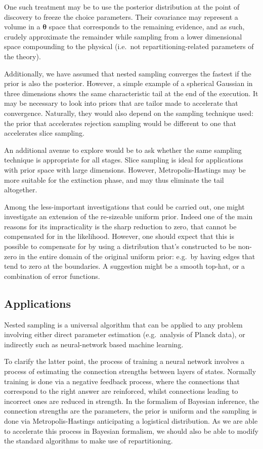 \documentclass[usenatbib]{mnras}
\begin{document}
One such treatment may be to use the posterior distribution at the
point of discovery to freeze the choice parameters. Their
covariance may represent a volume in a \(\bm{\theta}\) space that
corresponds to the remaining evidence, and as such, crudely
approximate the remainder while sampling from a lower dimensional
space compounding to the physical (i.e.~not repartitioning-related
parameters of the theory).

Additionally, we have assumed that nested sampling converges the
fastest if the prior is also the posterior. However, a simple
example of a spherical Gaussian in three dimensions shows the same
characteristic tail at the end of the execution. It may be
necessary to look into priors that are tailor made to accelerate
that convergence. Naturally, they would also depend on the sampling
technique used: the prior that accelerates rejection sampling would
be different to one that accelerates slice sampling.

An additional avenue to explore would be to ask whether the same
sampling technique is appropriate for all stages. Slice sampling is
ideal for applications with prior space with large
dimensions. However, Metropolis-Hastings may be more suitable for
the extinction phase, and may thus eliminate the tail altogether.

Among the less-important investigations that could be carried out,
one might investigate an extension of the re-sizeable uniform
prior. Indeed one of the main reasons for its impracticality is the
sharp reduction to zero, that cannot be compensated for in the
likelihood. However, one should expect that this is possible to
compensate for by using a distribution that's constructed to be
non-zero in the entire domain of the original uniform prior:
e.g.~by having edges that tend to zero at the boundaries. A
suggestion might be a smooth top-hat, or a combination of error
functions.

\subsection{Applications}\label{sec:orgc67317e}
Nested sampling is a universal algorithm that can be applied to any
problem involving either direct parameter estimation (e.g.~analysis
of Planck data), or indirectly such as neural-network based machine
learning.

To clarify the latter point, the process of training a neural
network involves a process of estimating the connection strengths
between layers of states. Normally training is done via a negative
feedback process, where the connections that correspond to the
right answer are reinforced, whilst connections leading to
incorrect ones are reduced in strength. In the formalism of
Bayesian inference, the connection strengths are the parameters,
the prior is uniform and the sampling is done via
Metropolis-Hastings anticipating a logistical distribution. As we
are able to accelerate this process in Bayesian formalism, we
should also be able to modify the standard algorithms to make use
of repartitioning.
\end{document}
